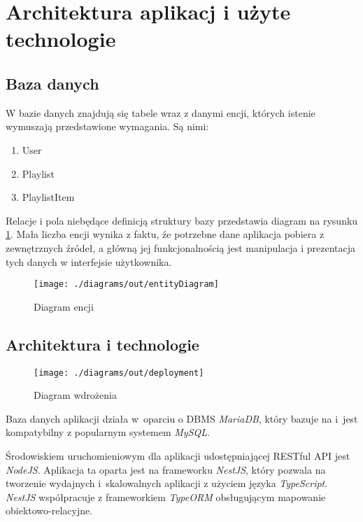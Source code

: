 \section{Architektura aplikacj i użyte technologie}

\subsection{Baza danych}
W bazie danych znajdują się tabele wraz z danymi encji, których istenie wymuszają przedstawione wymagania. Są nimi:
\begin{enumerate}[noitemsep]
    \item User
    \item Playlist
    \item PlaylistItem
\end{enumerate}
Relacje i pola niebędące definicją struktury bazy przedstawia diagram na rysunku \ref{erd}. Mała liczba encji wynika z faktu, źe potrzebne dane aplikacja pobiera z zewnętrznych źródeł, a główną jej funkcjonalnością jest manipulacja i prezentacja tych danych w interfejsie użytkownika. 

\begin{figure}[]
    \centering
    \texttt{[image: ./diagrams/out/entityDiagram]}
    \caption{Diagram encji}
    \label{erd}
\end{figure}


\subsection{Architektura i technologie}

\begin{figure}[]
    \centering
    \texttt{[image: ./diagrams/out/deployment]}
    \caption{Diagram wdrożenia}
    \label{deployment}
\end{figure}

Baza danych aplikacji działa w~oparciu o DBMS \textit{MariaDB}\cite{mariadb}, który bazuje na i~jest kompatybilny z popularnym systemem \textit{MySQL}. 

Środowiskiem uruchomieniowym dla aplikacji udostępniającej RESTful API jest \textit{NodeJS}\cite{NodeJS}. Aplikacja ta oparta jest na frameworku \textit{NestJS}\cite{NestJS}, który pozwala na tworzenie wydajnych i~skalowalnych aplikacji z użyciem języka \textit{TypeScript}. \textit{NestJS} współpracuje z frameworkiem \textit{TypeORM}\cite{typeorm} obsługującym mapowanie obiektowo-relacyjne.


